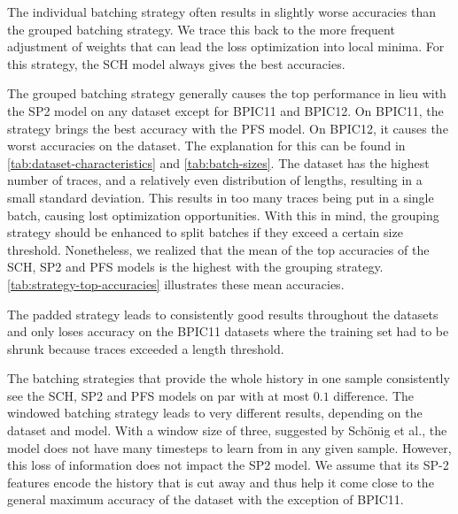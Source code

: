 The individual batching strategy often results in slightly worse accuracies than the grouped batching strategy. We trace this back to the more frequent adjustment of weights that can lead the loss optimization into local minima. For this strategy, the SCH model always gives the best accuracies.

The grouped batching strategy generally causes the top performance in lieu with the SP2 model on any dataset except for BPIC11 and BPIC12. On BPIC11, the strategy brings the best accuracy with the PFS model. On BPIC12, it causes the worst accuracies on the dataset. The explanation for this can be found in \autoref{tab:dataset-characteristics} and \autoref{tab:batch-sizes}. The dataset has the highest number of traces, and a relatively even distribution of lengths, resulting in a small standard deviation. This results in too many traces being put in a single batch, causing lost optimization opportunities. With this in mind, the grouping strategy should be enhanced to split batches if they exceed a certain size threshold. Nonetheless, we realized that the mean of the top accuracies of the SCH, SP2 and PFS models is the highest with the grouping strategy. \autoref{tab:strategy-top-accuracies} illustrates these mean accuracies.

The padded strategy leads to consistently good results throughout the datasets and only loses accuracy on the BPIC11 datasets where the training set had to be shrunk because traces exceeded a length threshold.

The batching strategies that provide the whole history in one sample consistently see the SCH, SP2 and PFS models on par with at most $0.1$ difference. The windowed batching strategy leads to very different results, depending on the dataset and model. With a window size of three, suggested by Schönig et al., the model does not have many timesteps to learn from in any given sample. However, this loss of information does not impact the SP2 model. We assume that its SP-2 features encode the history that is cut away and thus help it come close to the general maximum accuracy of the dataset with the exception of BPIC11.

